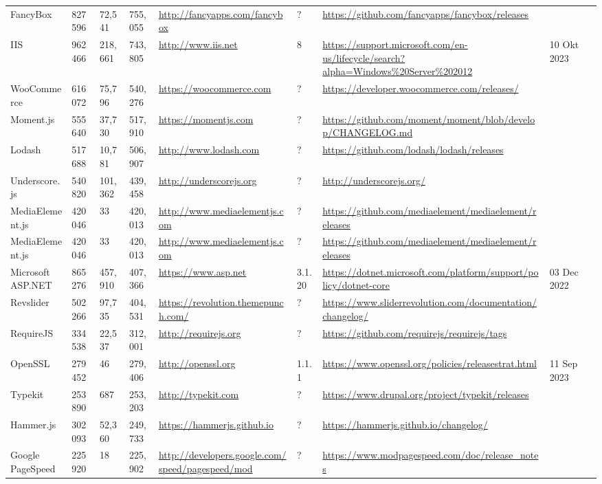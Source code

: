 \begin{table}[!htp]
\begin{tabular}{|l|l|l|l|l|l|l|l|l|}
				FancyBox &827596 &72,541 &755,055 &\ul{http://fancyapps.com/fancybox} &? &\ul{https://github.com/fancyapps/fancybox/releases} & \\
				IIS &962466 &218,661 &743,805 &\ul{http://www.iis.net} &8 &\ul{https://support.microsoft.com/en-us/lifecycle/search?alpha=Windows\%20Server\%202012} &10 Okt 2023 \\
				WooCommerce &616072 &75,796 &540,276 &\ul{https://woocommerce.com} &? &\ul{https://developer.woocommerce.com/releases/} & \\
				Moment.js &555640 &37,730 &517,910 &\ul{https://momentjs.com} &? &\ul{https://github.com/moment/moment/blob/develop/CHANGELOG.md} & \\
				Lodash &517688 &10,781 &506,907 &\ul{http://www.lodash.com} &? &\ul{https://github.com/lodash/lodash/releases} & \\
				Underscore.js &540820 &101,362 &439,458 &\ul{http://underscorejs.org} &? &\ul{http://underscorejs.org/} & \\
				MediaElement.js &420046 &33 &420,013 &\ul{http://www.mediaelementjs.com} &? &\ul{https://github.com/mediaelement/mediaelement/releases} & \\
				MediaElement.js &420046 &33 &420,013 &\ul{http://www.mediaelementjs.com} &? &\ul{https://github.com/mediaelement/mediaelement/releases} & \\
				Microsoft ASP.NET &865276 &457,910 &407,366 &\ul{https://www.asp.net} &3.1.20 &\ul{https://dotnet.microsoft.com/platform/support/policy/dotnet-core} &03 Dec 2022 \\
				Revslider &502266 &97,735 &404,531 &\ul{https://revolution.themepunch.com/} &? &\ul{https://www.sliderrevolution.com/documentation/changelog/} & \\
				RequireJS &334538 &22,537 &312,001 &\ul{http://requirejs.org} &? &\ul{https://github.com/requirejs/requirejs/tags} & \\
				OpenSSL &279452 &46 &279,406 &\ul{http://openssl.org} &1.1.1 &\ul{https://www.openssl.org/policies/releasestrat.html} &11 Sep 2023 \\
				Typekit &253890 &687 &253,203 &\ul{http://typekit.com} &? &\ul{https://www.drupal.org/project/typekit/releases} & \\
				Hammer.js &302093 &52,360 &249,733 &\ul{https://hammerjs.github.io} &? &\ul{https://hammerjs.github.io/changelog/} & \\
				Google PageSpeed &225920 &18 &225,902 &\ul{http://developers.google.com/speed/pagespeed/mod} &? &\ul{https://www.modpagespeed.com/doc/release\_notes} & \\

\end{tabular}
\end{table}
